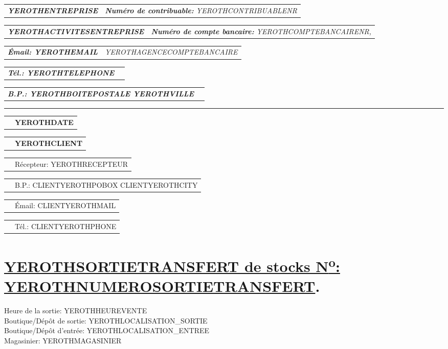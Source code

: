 \documentclass[11pt,YEROTHPAPERSPEC]{article} %
\makeatletter
\newcommand{\headerrow}[2]
{\begin{tabular*}{\linewidth}{l@{\extracolsep{\fill}}r}
	#1 &
	#2 \\
\end{tabular*}}
\newcommand{\emphbold}[1]{\textbf{\emph{#1}}\xspace}
\makeatother
\begin{document}
\bigskip

\headerrow
	{\emphbold{YEROTHENTREPRISE}}
	{\emph{\textbf{Num\'ero de contribuable:} YEROTHCONTRIBUABLENR}}
\headerrow
	{\emphbold{YEROTHACTIVITESENTREPRISE}}
	{\emph{\textbf{Num\'ero de compte bancaire:} YEROTHCOMPTEBANCAIRENR,}}
\headerrow
	{\emphbold{\'Email: YEROTHEMAIL}}
	{\emph{YEROTHAGENCECOMPTEBANCAIRE}}
\headerrow
	{\emphbold{T\'el.: YEROTHTELEPHONE}}
	{}
\headerrow
	{\emphbold{B.P.: YEROTHBOITEPOSTALE YEROTHVILLE}}
	{}
	
\hrule

\headerrow
	{}
	{\textbf{YEROTHDATE}} 

\vspace*{0.9cm}

\headerrow
{}
{\textbf{YEROTHCLIENT}}
\headerrow
{}
{R\'ecepteur: YEROTHRECEPTEUR}
\headerrow
{}
{B.P.: CLIENTYEROTHPOBOX CLIENTYEROTHCITY}
\headerrow
{}
{\'Email: CLIENTYEROTHMAIL}
\headerrow
{}
{T\'el.: CLIENTYEROTHPHONE}

\section*{\underline{YEROTHSORTIETRANSFERT de stocks N\textsuperscript{o}: YEROTHNUMEROSORTIETRANSFERT}.}
Heure de la sortie: YEROTHHEUREVENTE\\
Boutique/D\'ep\^ot de sortie: YEROTHLOCALISATION_SORTIE\\
Boutique/D\'ep\^ot d'entr\'ee: YEROTHLOCALISATION_ENTREE\\
Magasinier: YEROTHMAGASINIER

\vspace*{0.3cm}
\end{document}

